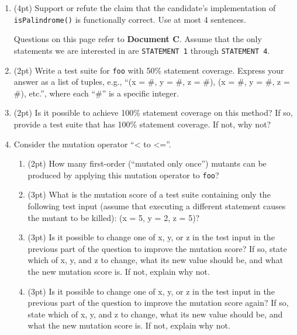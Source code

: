 \documentclass{report}
\newif\ifkey
\newcommand{\answershort}[1]{\ifkey\color{red}\underline{\textbf{#1}}\color{black}\else\underline{\hspace{3in}}\fi\xspace}
\newcommand{\answervshort}[1]{\ifkey\color{red}\underline{\textbf{#1}}\color{black}\else\underline{\hspace{1in}}\fi\xspace}
\newcommand{\answerlong}[1]{\ifkey\color{red}\textbf{#1}\color{black}\else\vspace{0.5in}\fi\xspace}
\newcommand*{\pts}[1]{\addtocounter{points}{#1}(#1pt)}
\begin{document}
\begin{spacing}{1.4}
\begin{enumerate}[leftmargin=*]
\item \pts{4} Support or refute the claim that the candidate's implementation of \lstinline{isPalindrome()} is functionally correct. Use
  at most 4 sentences.\\
  \answerlong{Refute. The candidate's implementation of isPalindrome() is not functionally correct. The candidate missed a base
case regarding x being a negative number. Negative integers would not count as a palindrome. {-313} reversed is {313-}.}
    
    \newpage

    Questions on this page refer to \textbf{Document C}.
    Assume that the only statements we are interested in are \lstinline{STATEMENT 1} through \lstinline{STATEMENT 4}.

  \item \label{sl1} \pts{2} Write a test suite for \lstinline{foo} with 50\% statement coverage. Express your answer as a list of tuples, e.g., ``(x = \#, y = \#, z = \#), (x = \#, y = \#, z = \#), etc.'', where each ``\#'' is a specific integer. \\
  \answerlong{(x = 6, y = 0, z = 3)}
    
  \item \pts{2} Is it possible to achieve 100\% statement coverage on this method? If so, provide a test suite that has 100\% statement coverage. If not, why not? \\
    \answerlong{It is not possible, because STATEMENT 2 is unreachable.}

  \item \label{el1} Consider the mutation operator ``< to <=''.
    \begin{enumerate}
    \item \pts{2} How many first-order (``mutated only once'') mutants can be produced by applying this mutation operator
    to \lstinline$foo$?\\ \answervshort{2}
    \item \pts{3} What is the mutation score of a test suite containing only the following test input (assume that executing a different statement causes the mutant to be killed):
    (x = 5, y = 2, z = 5)?\\ \answershort{0\%}
    \item \pts{3} Is it possible to change one of x, y, or z in the test input in the previous part of the question to improve the mutation score?
    If so, state which of x, y, and z to change, what its new value should be, and what the new mutation score is. If not, explain
    why not. \\
    \answerlong{z = 6 changes the mutation score to 50\%}
    \item \pts{3} Is it possible to change one of x, y, or z in the test input in the previous part of the question to improve the mutation score again?
    If so, state which of x, y, and z to change, what its new value should be, and what the new mutation score is. If not, explain
    why not. \\
    \answerlong{It is not, because the second mutant is an equivalent mutant.}
    \end{enumerate}


\end{enumerate}
\end{spacing}
\end{document}
